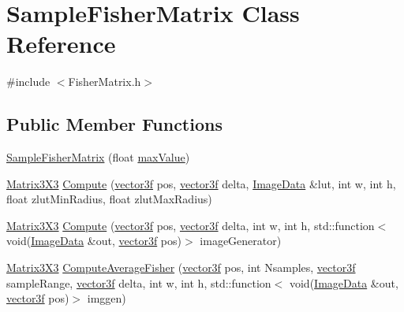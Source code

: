 \hypertarget{class_sample_fisher_matrix}{}\section{Sample\+Fisher\+Matrix Class Reference}
\label{class_sample_fisher_matrix}


{\ttfamily \#include $<$Fisher\+Matrix.\+h$>$}

\subsection*{Public Member Functions}
\begin{DoxyCompactItemize}
\item 
\hyperlink{class_sample_fisher_matrix_a13d1f746d50cd96be39d289e4879664a}{Sample\+Fisher\+Matrix} (float \hyperlink{class_sample_fisher_matrix_a0d6faf2b816bcdaa5e85b78a9731b8d0}{max\+Value})
\item 
\hyperlink{class_matrix3_x3}{Matrix3\+X3} \hyperlink{class_sample_fisher_matrix_abbb7a270019b9a81012d101a8327c434}{Compute} (\hyperlink{std__incl_8h_a2feaef1d85a74bd5cf80df91b1a9a914}{vector3f} pos, \hyperlink{std__incl_8h_a2feaef1d85a74bd5cf80df91b1a9a914}{vector3f} delta, \hyperlink{_queued_tracker_8h_a2d6726594ce64e82b9222b183f2571d1}{Image\+Data} \&lut, int w, int h, float zlut\+Min\+Radius, float zlut\+Max\+Radius)
\item 
\hyperlink{class_matrix3_x3}{Matrix3\+X3} \hyperlink{class_sample_fisher_matrix_a9af139862dc76bd4fd5d5e8e0a397eef}{Compute} (\hyperlink{std__incl_8h_a2feaef1d85a74bd5cf80df91b1a9a914}{vector3f} pos, \hyperlink{std__incl_8h_a2feaef1d85a74bd5cf80df91b1a9a914}{vector3f} delta, int w, int h, std\+::function$<$ void(\hyperlink{_queued_tracker_8h_a2d6726594ce64e82b9222b183f2571d1}{Image\+Data} \&out, \hyperlink{std__incl_8h_a2feaef1d85a74bd5cf80df91b1a9a914}{vector3f} pos)$>$ image\+Generator)
\item 
\hyperlink{class_matrix3_x3}{Matrix3\+X3} \hyperlink{class_sample_fisher_matrix_a6082b4660ccbcd84b95103a66c008ce4}{Compute\+Average\+Fisher} (\hyperlink{std__incl_8h_a2feaef1d85a74bd5cf80df91b1a9a914}{vector3f} pos, int Nsamples, \hyperlink{std__incl_8h_a2feaef1d85a74bd5cf80df91b1a9a914}{vector3f} sample\+Range, \hyperlink{std__incl_8h_a2feaef1d85a74bd5cf80df91b1a9a914}{vector3f} delta, int w, int h, std\+::function$<$ void(\hyperlink{_queued_tracker_8h_a2d6726594ce64e82b9222b183f2571d1}{Image\+Data} \&out, \hyperlink{std__incl_8h_a2feaef1d85a74bd5cf80df91b1a9a914}{vector3f} pos)$>$ imggen)
\end{DoxyCompactItemize}
